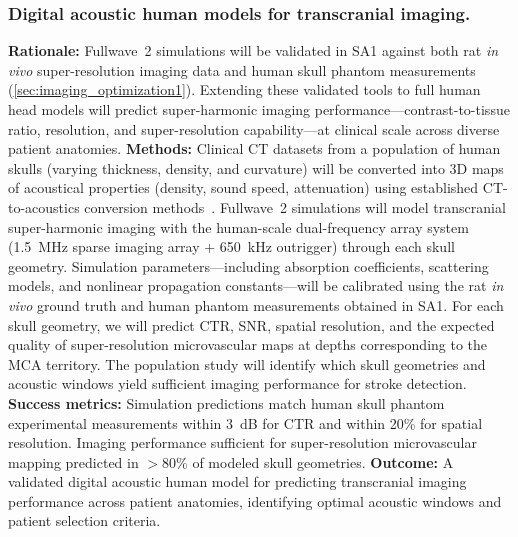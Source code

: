 \subsubsection{Digital acoustic human models for transcranial imaging.\label{sec:digital_imaging}}
\textbf{Rationale:} Fullwave~2 simulations will be validated in SA1 against both rat \textit{in vivo} super-resolution imaging data and human skull phantom measurements (\ref{sec:imaging_optimization1}). Extending these validated tools to full human head models will predict super-harmonic imaging performance---contrast-to-tissue ratio, resolution, and super-resolution capability---at clinical scale across diverse patient anatomies. \textbf{Methods:} Clinical CT datasets from a population of human skulls (varying thickness, density, and curvature) will be converted into 3D maps of acoustical properties (density, sound speed, attenuation) using established CT-to-acoustics conversion methods~\cite{Aubry2003,aubry2010high,pinton2009phase}. Fullwave~2 simulations will model transcranial super-harmonic imaging with the human-scale dual-frequency array system (1.5~MHz sparse imaging array + 650~kHz outrigger) through each skull geometry. Simulation parameters---including absorption coefficients, scattering models, and nonlinear propagation constants---will be calibrated using the rat \textit{in vivo} ground truth and human phantom measurements obtained in SA1. For each skull geometry, we will predict CTR, SNR, spatial resolution, and the expected quality of super-resolution microvascular maps at depths corresponding to the MCA territory. The population study will identify which skull geometries and acoustic windows yield sufficient imaging performance for stroke detection. \textbf{Success metrics:} Simulation predictions match human skull phantom experimental measurements within 3~dB for CTR and within 20\% for spatial resolution. Imaging performance sufficient for super-resolution microvascular mapping predicted in $>$80\% of modeled skull geometries. \textbf{Outcome:} A validated digital acoustic human model for predicting transcranial imaging performance across patient anatomies, identifying optimal acoustic windows and patient selection criteria.

